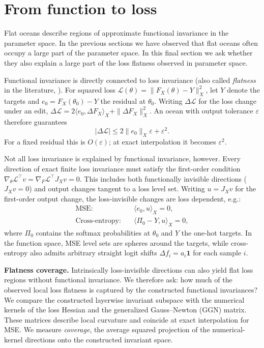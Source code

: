 \documentclass[twoside]{article}
\theoremstyle{remark}
\theoremstyle{highlightdefinition}
\theoremstyle{remark}
\begin{document}
\section{From function to loss}
\label{sec:discussion}
Flat oceans describe regions of approximate functional invariance in the parameter space. In the previous sections we have observed that flat oceans often occupy a large part of the parameter space. In this final section we ask whether they also explain a large part of the loss flatness observed in parameter space.

Functional invariance is directly connected to loss invariance (also called \emph{flatness} in the literature, \citep{sagun2017hessian}). For squared loss $\mathcal L(\theta)=\|F_X(\theta)-Y\|_X^2$, let $Y$ denote the targets and $e_0=F_X(\theta_0)-Y$ the residual at $\theta_0$. Writing $\Delta\mathcal L$ for the loss change under an edit, $\Delta\mathcal L=2\langle e_0,\Delta F_X\rangle_X+\|\Delta F_X\|_X^2$.
An ocean with output tolerance $\varepsilon$ therefore guarantees
\[
 |\Delta\mathcal L|\le2\|e_0\|_X\varepsilon+\varepsilon^2.
\]
For a fixed residual this is $O(\varepsilon)$; at exact interpolation it becomes $\varepsilon^2$.

Not all loss invariance is explained by functional invariance, however. Every direction of exact finite loss invariance must satisfy the first-order condition $
 \nabla_\theta\mathcal L^\top v
 =\nabla_F\mathcal L^\top J_Xv=0.
$
This includes both functionally invisible directions ($J_Xv=0$) and output changes tangent to a loss level set. Writing $u=J_Xv$ for the first-order output change, the loss-invisible changes are loss dependent, e.g.:
\[
 \begin{aligned}
 \text{MSE:}&\quad \langle e_0,u\rangle_X=0,\\
 \text{Cross-entropy:}&\quad \langle\Pi_0-Y,u\rangle_X=0,
 \end{aligned}
\]
where $\Pi_0$ contains the softmax probabilities at $\theta_0$ and $Y$ the one-hot targets. In the function space, MSE level sets are spheres around the targets, while cross-entropy also admits arbitrary straight logit shifts $\Delta f_i=a_i\mathbf1$ for each sample $i$. 

\textbf{Flatness coverage.} \;\;
Intrinsically loss-invisible directions can also yield flat loss regions without functional invariance. We therefore ask: how much of the observed local loss flatness is captured by the constructed functional invariances? We compare the constructed layerwise invariant subspace with the numerical kernels of the loss Hessian and the generalized Gauss--Newton (GGN) matrix. These matrices describe local curvature and coincide at exact interpolation for MSE. We measure \emph{coverage}, the average squared projection of the numerical-kernel directions onto the constructed invariant space.
\end{document}
